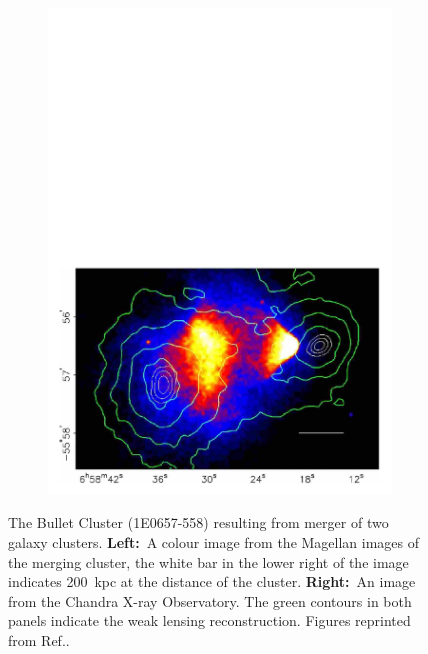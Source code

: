 \begin{figure}[!ht]
\begin{subfigure}{0.49\textwidth}
         \includegraphics[width=\textwidth]{figures/DMOverview/f1b.new.jpeg2ps.pdf}
         \caption{}
         \label{fig:DMOverview/BCXrayData}
     \end{subfigure}
     \caption{The Bullet Cluster (1E0657-558) resulting from merger of two galaxy clusters. \textbf{Left:}~A colour image from the Magellan images of the merging cluster, the white bar in the lower right of the image indicates 200~kpc at the distance of the cluster. \textbf{Right:}~An image from the Chandra X-ray Observatory. The green contours in both panels indicate the weak lensing reconstruction. Figures reprinted from Ref.\cite{Clowe2006}.}
     \label{fig:DMOverview/BulletCluster}
\end{figure}
